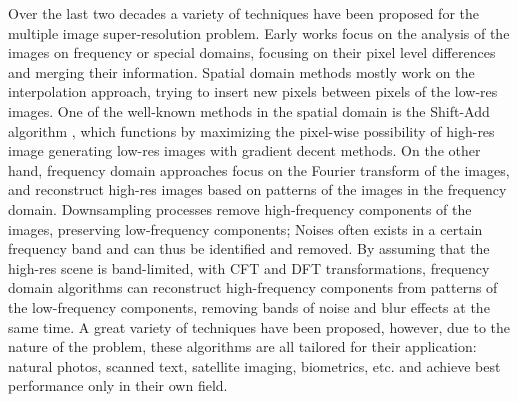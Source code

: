 Over the last two decades a variety of techniques have been proposed for the multiple image super-resolution problem. Early works focus on the analysis of the images on frequency or special domains, focusing on their pixel level differences and merging their information. Spatial domain methods mostly work on the interpolation approach, trying to insert new pixels between pixels of the low-res images. One of the well-known methods in the spatial domain is the Shift-Add algorithm \cite{farsiu2003robust}, which functions by maximizing the pixel-wise possibility of high-res image generating low-res images with gradient decent methods. On the other hand, frequency domain approaches focus on the Fourier transform of the images, and reconstruct high-res images based on patterns of the images in the frequency domain. Downsampling processes remove high-frequency components of the images, preserving low-frequency components; Noises often exists in a certain frequency band and can thus be identified and removed. By assuming that the high-res scene is band-limited, with CFT and DFT transformations, frequency domain algorithms can reconstruct high-frequency components from patterns of the low-frequency components, removing bands of noise and blur effects at the same time. A great variety of techniques have been proposed, however, due to the nature of the problem, these algorithms are all tailored for their application: natural photos, scanned text, satellite imaging, biometrics, etc. and achieve best performance only in their own field.

